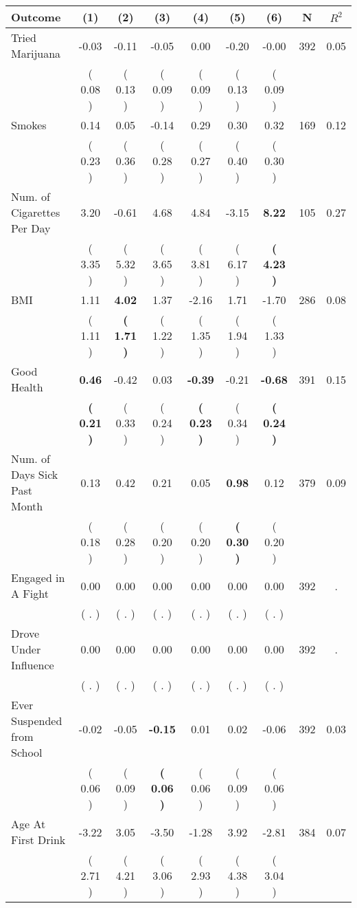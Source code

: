 \begin{tabular}{lcccccccc}
\toprule
 \textbf{Outcome} & \textbf{(1)} & \textbf{(2)} & \textbf{(3)} & \textbf{(4)} & \textbf{(5)} & \textbf{(6)} & \textbf{N} & \textbf{$ R^2$} \\
\midrule
Tried Marijuana &     -0.03 &     -0.11 &     -0.05 &      0.00 &     -0.20 &     -0.00 & 392 &       0.05 \\ 
 & (     0.08 ) & (     0.13 ) & (     0.09 ) & (     0.09 ) & (     0.13 ) & (     0.09 ) & \\
Smokes &      0.14 &      0.05 &     -0.14 &      0.29 &      0.30 &      0.32 & 169 &       0.12 \\ 
 & (     0.23 ) & (     0.36 ) & (     0.28 ) & (     0.27 ) & (     0.40 ) & (     0.30 ) & \\
Num. of Cigarettes Per Day &      3.20 &     -0.61 &      4.68 &      4.84 &     -3.15 & \textbf{     8.22} & 105 &       0.27 \\ 
 & (     3.35 ) & (     5.32 ) & (     3.65 ) & (     3.81 ) & (     6.17 ) & \textbf{(     4.23 )} & \\
BMI &      1.11 & \textbf{     4.02} &      1.37 &     -2.16 &      1.71 &     -1.70 & 286 &       0.08 \\ 
 & (     1.11 ) & \textbf{(     1.71 )} & (     1.22 ) & (     1.35 ) & (     1.94 ) & (     1.33 ) & \\
Good Health & \textbf{     0.46} &     -0.42 &      0.03 & \textbf{    -0.39} &     -0.21 & \textbf{    -0.68} & 391 &       0.15 \\ 
 & \textbf{(     0.21 )} & (     0.33 ) & (     0.24 ) & \textbf{(     0.23 )} & (     0.34 ) & \textbf{(     0.24 )} & \\
Num. of Days Sick Past Month &      0.13 &      0.42 &      0.21 &      0.05 & \textbf{     0.98} &      0.12 & 379 &       0.09 \\ 
 & (     0.18 ) & (     0.28 ) & (     0.20 ) & (     0.20 ) & \textbf{(     0.30 )} & (     0.20 ) & \\
Engaged in A Fight &      0.00 &      0.00 &      0.00 &      0.00 &      0.00 &      0.00 & 392 &          . \\ 
 & (        . ) & (        . ) & (        . ) & (        . ) & (        . ) & (        . ) & \\
Drove Under Influence &      0.00 &      0.00 &      0.00 &      0.00 &      0.00 &      0.00 & 392 &          . \\ 
 & (        . ) & (        . ) & (        . ) & (        . ) & (        . ) & (        . ) & \\
Ever Suspended from School &     -0.02 &     -0.05 & \textbf{    -0.15} &      0.01 &      0.02 &     -0.06 & 392 &       0.03 \\ 
 & (     0.06 ) & (     0.09 ) & \textbf{(     0.06 )} & (     0.06 ) & (     0.09 ) & (     0.06 ) & \\
Age At First Drink &     -3.22 &      3.05 &     -3.50 &     -1.28 &      3.92 &     -2.81 & 384 &       0.07 \\ 
 & (     2.71 ) & (     4.21 ) & (     3.06 ) & (     2.93 ) & (     4.38 ) & (     3.04 ) & \\
\bottomrule
\end{tabular}
